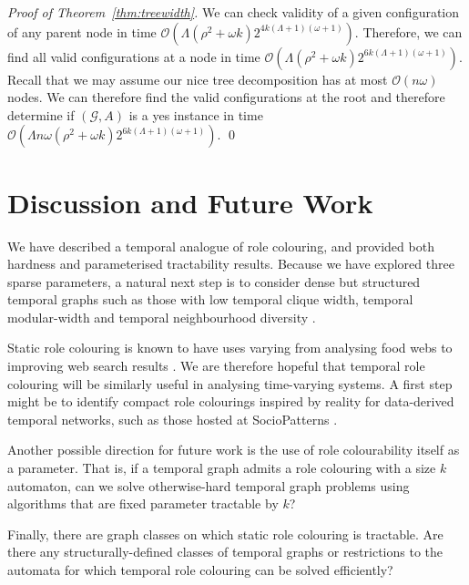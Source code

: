 \documentclass[runningheads]{llncs}
\begin{document}
\begin{proof}[Proof of Theorem~\ref{thm:treewidth}]
We can check validity of a given configuration of any parent node in time $\mathcal{O}(\Lambda(\rho^2+\omega k)2^{4k(\Lambda+1)(\omega+1)})$. Therefore, we can find all valid configurations at a node in time $\mathcal{O}(\Lambda(\rho^2+\omega k)2^{6k(\Lambda+1)(\omega+1)})$.
Recall that we may assume our nice tree decomposition has at most $\mathcal{O}(n\omega)$ nodes\cite{cygan2015parameterized}. 
We can therefore find the valid configurations at the root and therefore determine if $(\mathcal{G},A)$ is a yes instance in time $\mathcal{O}(\Lambda n\omega(\rho^2+\omega k)2^{6k(\Lambda+1)(\omega+1)})$.
 \qed \end{proof}

\section{Discussion and Future Work}
We have described a temporal analogue of role colouring, and provided both hardness and parameterised tractability results.  Because we have explored three sparse parameters, a natural next step is to consider dense but structured temporal graphs such as those with low temporal clique width, temporal modular-width and temporal neighbourhood diversity \cite{enright2024structural}.

Static role colouring is known to have uses varying from analysing food webs \cite{luczkovich2003defining} to improving web search results \cite{scripps2007node}.  We are therefore hopeful that temporal role colouring will be similarly useful in analysing time-varying systems. A first step might be to identify compact role colourings inspired by reality for data-derived temporal networks, such as those  hosted at SocioPatterns \cite{sociopatternsSocioPatternsx2013}.


Another possible direction for future work is the use of role colourability itself as a parameter.  That is, if a temporal graph admits a role colouring with a size $k$ automaton, can we solve otherwise-hard temporal graph problems using algorithms that are fixed parameter tractable by $k$?


Finally, there are graph classes on which static role colouring is tractable.
%
Are there any structurally-defined classes of temporal graphs or restrictions to the automata for which temporal role colouring can be solved efficiently?
\end{document}
